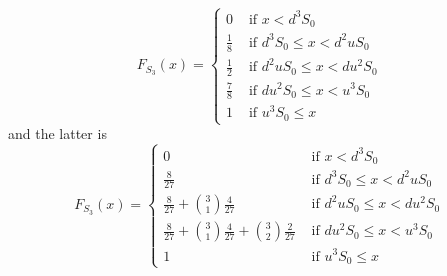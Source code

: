 \documentclass{report}
\begin{document}
{\begin{minipage}{39em}
\begin{equation}
F_{S_3}(x)=\begin{cases}
  0& \text{ if  }x<d^3S_0\\
  \frac{1}{8}& \text{ if  }d^3S_0\leq x<d^2uS_0\\
  \frac{1}{2}& \text{ if  }d^2uS_0\leq x<du^2S_0\\
  \frac{7}{8}& \text{ if  }du^2S_0\leq x<u^3S_0\\
  1& \text{ if  }u^3S_0\leq x
\end{cases}
\end{equation}
and the latter is
\begin{equation}
F_{S_3}(x)=\begin{cases}
  0& \text{ if  }x<d^3S_0\\
  \frac{8}{27}& \text{ if  }d^3S_0\leq x<d^2uS_0\\
  \frac{8}{27}+\binom{3}{1}\frac{4}{27}& \text{ if  }d^2uS_0\leq x<du^2S_0\\
  \frac{8}{27}+\binom{3}{1}\frac{4}{27}+\binom{3}{2}\frac{2}{27}& \text{ if  }du^2S_0\leq x<u^3S_0\\
  1& \text{ if  }u^3S_0\leq x
\end{cases}
\end{equation}
\end{minipage}}
\end{document}
